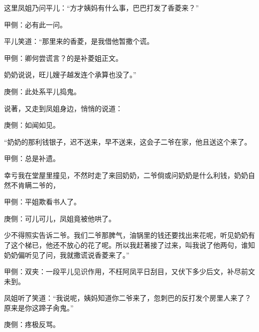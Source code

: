 \begin{parag}
    这里凤姐乃问平儿：“方才姨妈有什么事，巴巴打发了香菱来？”\begin{note}甲侧：必有此一问。\end{note}平儿笑道：“那里来的香菱，是我借他暂撒个谎。\begin{note}甲侧：卿何尝谎言？的是补菱姐正文。\end{note}奶奶说说，旺儿嫂子越发连个承算也没了。”\begin{note}庚侧：此处系平儿捣鬼。\end{note}说著，又走到凤姐身边，悄悄的说道：\begin{note}庚侧：如闻如见。\end{note}“奶奶的那利钱银子，迟不送来，早不送来，这会子二爷在家，他且送这个来了。\begin{note}甲侧：总是补遗。\end{note}幸亏我在堂屋里撞见，不然时走了来回奶奶，二爷倘或问奶奶是什么利钱，奶奶自然不肯瞒二爷的，\begin{note}甲侧：平姐欺看书人了。\end{note}\begin{note}庚侧：可儿可儿，凤姐竟被他哄了。\end{note}少不得照实告诉二爷。我们二爷那脾气，油锅里的钱还要找出来花呢，听见奶奶有了这个梯已，他还不放心的花了呢。所以我赶著接了过来，叫我说了他两句，谁知奶奶偏听见了问，我就撒谎说香菱来了。”\begin{note}甲侧：双夹：一段平儿见识作用，不枉阿凤平日刮目，又伏下多少后文，补尽前文未到。\end{note}凤姐听了笑道：“我说呢，姨妈知道你二爷来了，忽刺巴的反打发个房里人来了？原来是你这蹄子肏鬼。”\begin{note}庚侧：疼极反骂。\end{note}
\end{parag}


